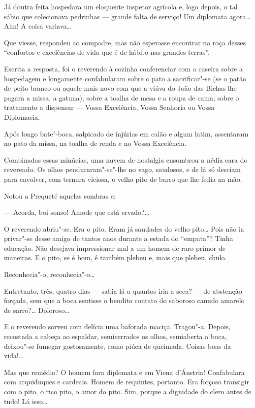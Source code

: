 Já doutra feita hospedara um eloquente inspetor agrícola e, logo depois,
o tal sábio que colecionava pedrinhas --- grande falta de serviço! Um
diplomata agora\ldots{} Ahn! A coisa variava\ldots{}

Que viesse, respondeu ao compadre, mas não esperasse encontrar na roça
desses ``confortos e excelências de vida que é de hábito nas grandes
terras''.

Escrita a resposta, foi o reverendo à cozinha conferenciar com a caseira
sobre a hospedagem e longamente confabularam sobre o pato a
sacrificar"-se (se o patão de peito branco ou aquele mais novo com que a
viúva do João das Bichas lhe pagara a missa, a gatuna); sobre a toalha
de mesa e a roupa de cama; sobre o tratamento a dispensar --- Vossa
Excelência, Vossa Senhoria ou Vossa Diplomacia.

Após longo bate"-boca, salpicado de injúrias em calão e algum latim,
assentaram no pato da missa, na toalha de renda e no Vossa Excelência.

Combinadas essas minúcias, uma nuvem de nostalgia ensombrou a nédia cara
do reverendo. Os olhos penduraram"-se"-lhe no vago, saudosos, e de lá só
desciam para envolver, com ternura viciosa, o velho pito de barro que
lhe fedia na mão.

Notou a Prequeté aquelas sombras e:

--- Acorda, boi sonso! Amode que está ervado?\ldots{}

O reverendo abriu"-se. Era o pito. Eram já saudades do velho pito\ldots{} Pois
não ia privar"-se desse amigo de tantos anos durante a estada do
``empata''? Tinha educação. Não desejava impressionar mal a um homem de
raro primor de maneiras. E o pito, se é bom, é também plebeu e, mais que
plebeu, chulo.

Reconhecia"-o, reconhecia"-o\ldots{}

Entretanto, três, quatro dias --- sabia lá a quantos iria a seca? --- de
abstenção forçada, sem que a boca sentisse o bendito contato do saboroso
canudo amarelo de sarro?\ldots{} Doloroso\ldots{}

E o reverendo sorveu com delícia uma baforada maciça. Tragou"-a. Depois,
recostada a cabeça ao espaldar, semicerrados os olhos, semiaberta a
boca, deixou"-se fumegar gostosamente, como piúca de queimada. Coisas
boas da vida!\ldots{}

Mas que remédio? O homem fora diplomata e em Viena d'Áustria!
Confabulara com arquiduques e cardeais. Homem de requintes, portanto.
Era forçoso transigir com o pito, o rico pito, o amor do pito. Sim,
porque a dignidade do clero antes de tudo! Lá isso\ldots{}

